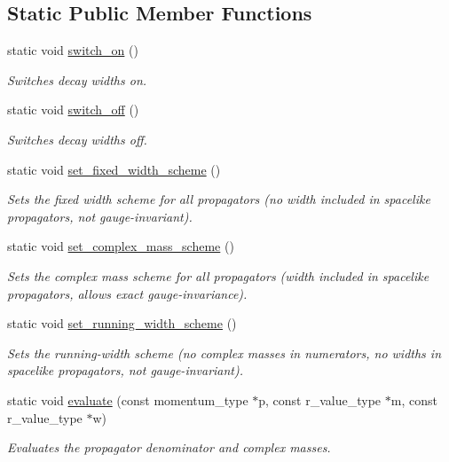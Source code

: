 \subsection*{Static Public Member Functions}
\begin{DoxyCompactItemize}
\item 
\hypertarget{a00598_addc9d8521f00c9a7a7d6a95dec92f690}{}static void \hyperlink{a00598_addc9d8521f00c9a7a7d6a95dec92f690}{switch\+\_\+on} ()\label{a00598_addc9d8521f00c9a7a7d6a95dec92f690}

\begin{DoxyCompactList}\small\item\em Switches decay widths on. \end{DoxyCompactList}\item 
\hypertarget{a00598_a5d2ec56553381befe2b8325825707bc9}{}static void \hyperlink{a00598_a5d2ec56553381befe2b8325825707bc9}{switch\+\_\+off} ()\label{a00598_a5d2ec56553381befe2b8325825707bc9}

\begin{DoxyCompactList}\small\item\em Switches decay widths off. \end{DoxyCompactList}\item 
static void \hyperlink{a00598_aea7e3012da06c62d52658d10d8aff899}{set\+\_\+fixed\+\_\+width\+\_\+scheme} ()
\begin{DoxyCompactList}\small\item\em Sets the fixed width scheme for all propagators (no width included in spacelike propagators, not gauge-\/invariant). \end{DoxyCompactList}\item 
static void \hyperlink{a00598_ab66801bcee8fd7a0a7b0b31b8d3b78a9}{set\+\_\+complex\+\_\+mass\+\_\+scheme} ()
\begin{DoxyCompactList}\small\item\em Sets the complex mass scheme for all propagators (width included in spacelike propagators, allows exact gauge-\/invariance). \end{DoxyCompactList}\item 
static void \hyperlink{a00598_a6aa165a9a785eb084d64a85eacaef6ce}{set\+\_\+running\+\_\+width\+\_\+scheme} ()
\begin{DoxyCompactList}\small\item\em Sets the running-\/width scheme (no complex masses in numerators, no widths in spacelike propagators, not gauge-\/invariant). \end{DoxyCompactList}\item 
\hypertarget{a00598_ab4bf29edf1e9b2c179dca861b61e9e4a}{}static void \hyperlink{a00598_ab4bf29edf1e9b2c179dca861b61e9e4a}{evaluate} (const momentum\+\_\+type $\ast$p, const r\+\_\+value\+\_\+type $\ast$m, const r\+\_\+value\+\_\+type $\ast$w)\label{a00598_ab4bf29edf1e9b2c179dca861b61e9e4a}

\begin{DoxyCompactList}\small\item\em Evaluates the propagator denominator and complex masses. \end{DoxyCompactList}\end{DoxyCompactItemize}
